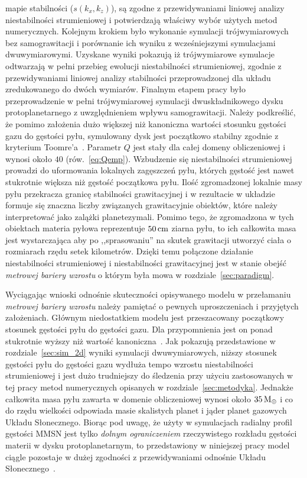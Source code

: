 mapie stabilności ($s(k_x, k_z)$), są zgodne z przewidywaniami liniowej analizy
niestabilności strumieniowej i potwierdzają właściwy wybór użytych metod
numerycznych. Kolejnym krokiem było wykonanie symulacji trójwymiarowych bez
samograwitacji i porównanie ich wyniku z wcześniejszymi symulacjami
dwuwymiarowymi. Uzyskane wyniki pokazują iż trójwymiarowe symulacje odtwarzają w
pełni przebieg ewolucji niestabilności strumieniowej, zgodnie z przewidywaniami
liniowej analizy stabilności przeprowadzonej dla układu zredukowanego do dwóch
wymiarów. Finalnym etapem pracy było przeprowadzenie w pełni trójwymiarowej
symulacji dwuskładnikowego dysku protoplanetarnego z uwzględnieniem wpływu
samograwitacji. Należy podkreślić, że pomimo założenia dużo większej niż
kanoniczna wartości stosunku gęstości gazu do gęstości pyłu, symulowany dysk
jest początkowo stabilny zgodnie z kryterium Toomre'a~.
Parametr $Q$ jest stały dla całej domeny obliczeniowej i wynosi około $40$
(rów.~\ref{eq:Qemp}). Wzbudzenie się niestabilności strumieniowej prowadzi do
uformowania lokalnych zagęszczeń pyłu, których gęstość jest nawet stukrotnie
większa niż gęstość początkowa pyłu. Ilość zgromadzonej lokalnie masy pyłu
przekracza granicę stabilności grawitacyjnej i w rezultacie w układzie formuje
się znaczna liczby związanych grawitacyjnie obiektów, które należy interpretować
jako zalążki planetezymali. Pomimo tego, że zgromadzona w tych obiektach materia
pyłowa reprezentuje $50\hbox{$\thinspace\textrm{cm}$}$ ziarna pyłu, to ich całkowita masa jest
wystarczająca aby po ,,sprasowaniu'' na skutek grawitacji utworzyć ciała o
rozmiarach rzędu setek kilometrów. Dzięki temu połączone działanie
niestabilności strumieniowej i niestabilności grawitacyjnej jest w stanie obejść
\emph{metrowej bariery wzrostu} o którym była mowa w
rozdziale~\ref{sec:paradigm}.
%
\par Wyciągając wnioski odnośnie skuteczności opisywanego modelu w przełamaniu
\emph{metrowej bariery wzrostu} należy pamiętać o pewnych uproszczeniach i
przyjętych założeniach. Głównym niedostatkiem modelu jest przeszacowany
początkowy stosunek gęstości pyłu do gęstości gazu. Dla przypomnienia jest on
ponad stukrotnie wyższy niż wartość kanoniczna~\cite{FS03}. Jak pokazują
przedstawione w rozdziale~\ref{sec:sim_2d} wyniki symulacji dwuwymiarowych,
niższy stosunek gęstości pyłu do gęstości gazu wydłuża tempo wzrostu
niestabilności strumieniowej i jest dużo trudniejszy do śledzenia przy użyciu
zastosowanych w tej pracy metod numerycznych opisanych w
rozdziale~\ref{sec:metodyka}. Jednakże całkowita masa pyłu zawarta w domenie
obliczeniowej wynosi około $35\hbox{$\mathrm{\thinspace M_{\oplus}}$}$ i co do rzędu wielkości odpowiada masie
skalistych planet i jąder planet gazowych Układu Słonecznego. Biorąc pod uwagę,
że użyty w symulacjach radialny profil gęstości MMSN jest tylko \emph{dolnym
ograniczeniem} rzeczywistego rozkładu gęstości materii w dysku protoplanetarnym,
to przedstawiony w niniejszej pracy model ciągle pozostaje w dużej zgodności z
przewidywaniami odnośnie Układu Słonecznego~\cite{D07}.

